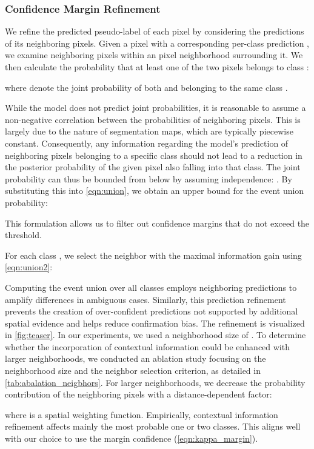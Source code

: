 \documentclass{article}
\begin{document}
\subsubsection{Confidence Margin Refinement}
\label{sec:pseudo-labels}

We refine the predicted pseudo-label of each pixel by considering the predictions of its neighboring pixels. Given a pixel  with a corresponding per-class prediction , we examine neighboring pixels  within an  pixel neighborhood surrounding it. We then calculate the probability that at least one of the two pixels belongs to class :

where  denote the joint probability of both  and  belonging to the same class . 

While the model does not predict joint probabilities, it is reasonable to assume a non-negative correlation between the probabilities of neighboring pixels. This is largely due to the nature of segmentation maps, which are typically piecewise constant. Consequently, any information regarding the model's prediction of neighboring pixels belonging to a specific class should not lead to a reduction in the posterior probability of the given pixel also falling into that class. The joint probability can thus be bounded from below by assuming independence: . By substituting this into \cref{eqn:union}, we obtain an upper bound for the event union probability:

This formulation allows us to filter out confidence margins that do not exceed the threshold.

For each class , we select the neighbor with the maximal information gain using \cref{eqn:union2}:

Computing the event union over all classes employs neighboring predictions to amplify differences in ambiguous cases.
Similarly, this prediction refinement prevents the creation of over-confident predictions not supported by additional spatial evidence and helps reduce confirmation bias. The refinement is visualized in \cref{fig:teaser}. In our experiments, we used a neighborhood size of .
To determine whether the incorporation of contextual information could be enhanced with larger neighborhoods, we conducted an ablation study focusing on the neighborhood size and the neighbor selection criterion, as detailed in \cref{tab:abalation_neigbhors}. For larger neighborhoods, we decrease the probability contribution of the neighboring pixels with a distance-dependent factor:
 
where  is a spatial weighting function.
Empirically, contextual information refinement affects mainly the most probable one or two classes.
This aligns well with our choice to use the margin confidence (\ref{eqn:kappa_margin}).
\end{document}
